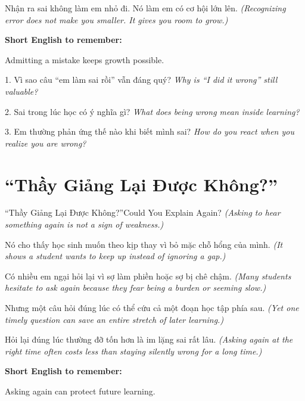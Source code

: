 \begin{baihoc}
Nhận ra sai không làm em nhỏ đi. Nó làm em có cơ hội lớn lên.
\textit{(Recognizing error does not make you smaller. It gives you room to grow.)}
\end{baihoc}

\begin{ghinhoanh}
\textbf{Short English to remember:}

Admitting a mistake keeps growth possible.

\end{ghinhoanh}

\begin{tuhocnhanh}
1. Vì sao câu ``em làm sai rồi'' vẫn đáng quý? \textit{Why is ``I did it wrong'' still valuable?}

2. Sai trong lúc học có ý nghĩa gì? \textit{What does being wrong mean inside learning?}

3. Em thường phản ứng thế nào khi biết mình sai? \textit{How do you react when you realize you are wrong?}
\end{tuhocnhanh}
\ngancach

\section{``Thầy Giảng Lại Được Không?''}
\begin{truyen}{``Thầy Giảng Lại Được Không?''}{Could You Explain Again?}
\textit{(Asking to hear something again is not a sign of weakness.)}

Nó cho thấy học sinh muốn theo kịp thay vì bỏ mặc chỗ hổng của mình.
\textit{(It shows a student wants to keep up instead of ignoring a gap.)}

Có nhiều em ngại hỏi lại vì sợ làm phiền hoặc sợ bị chê chậm.
\textit{(Many students hesitate to ask again because they fear being a burden or seeming slow.)}

Nhưng một câu hỏi đúng lúc có thể cứu cả một đoạn học tập phía sau.
\textit{(Yet one timely question can save an entire stretch of later learning.)}
\end{truyen}

\begin{baihoc}
Hỏi lại đúng lúc thường đỡ tốn hơn là im lặng sai rất lâu.
\textit{(Asking again at the right time often costs less than staying silently wrong for a long time.)}
\end{baihoc}

\begin{ghinhoanh}
\textbf{Short English to remember:}

Asking again can protect future learning.

\end{ghinhoanh}

